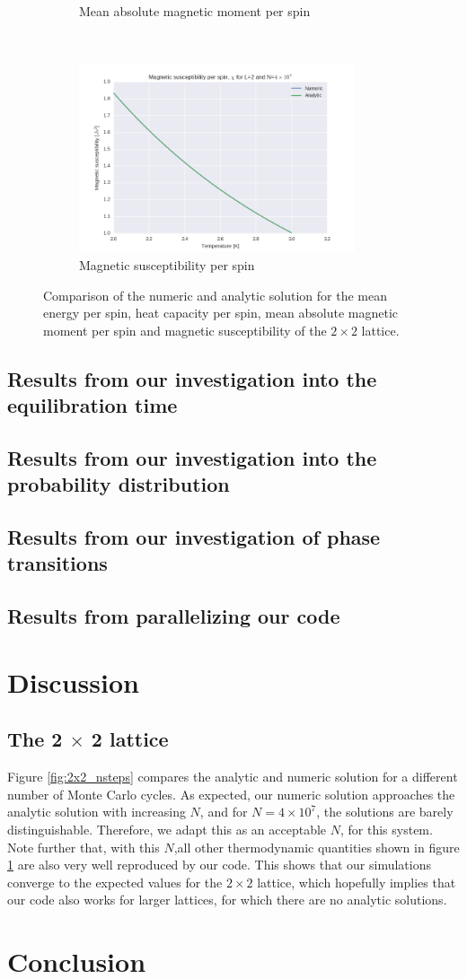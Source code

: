 \documentclass[a4paper, 10pt]{article}
\begin{document}
\begin{figure}[!ht]
\begin{subfigure}[H!]{0.5\textwidth}
        \caption{Mean absolute magnetic moment per spin}
    \end{subfigure}%
    ~ 
    \begin{subfigure}[H!]{0.5\textwidth}
        \centering
        \includegraphics[height=2.2in]{L2MagSus4e7.png}
        \caption{Magnetic susceptibility per spin}
    \end{subfigure}
    \caption{Comparison of the numeric and  analytic solution for the mean energy per spin, heat capacity per spin, mean absolute magnetic moment per spin and magnetic susceptibility of the $2 \times 2$ lattice. }\label{fig:2x2_thermo}
\end{figure}
\subsection{Results from our investigation into the equilibration time}
\subsection{Results from our investigation into the probability distribution}
\subsection{Results from our investigation of phase transitions}
\subsection{Results from parallelizing our code}
\section{Discussion}
\subsection{The 2 $\times$ 2 lattice}
Figure \ref{fig:2x2_nsteps} compares the analytic and numeric solution for a different number of Monte Carlo cycles. As expected, our numeric solution approaches the analytic solution with increasing $N$, and for $N=4\times 10^7$, the solutions are barely distinguishable. Therefore, we adapt this as an acceptable $N$, for this system.  Note further that, with this $N$,all other thermodynamic quantities shown in figure \ref{fig:2x2_thermo} are also very well reproduced by our code. This shows that our simulations converge to the expected values for the $2\times2$ lattice, which hopefully implies that our code also works for larger lattices, for which there are no analytic solutions.
\section{Conclusion}
\end{document}
